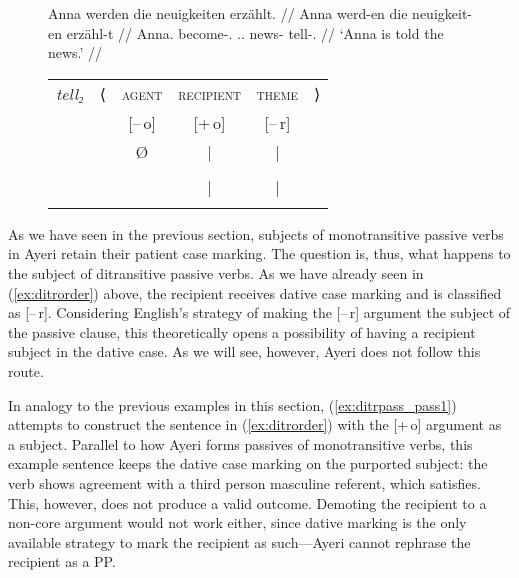 \begin{figure}
\a\label{ex:gerditrpass_pass2}%
\begingl
	\gla Anna werden die neuigkeiten erzählt. //
	\glb Anna werd-en die neuigkeit-en erzähl-t //
	\glc Anna.\Dat{} become-\Tpl{}.\Prs{} \Def{}.\Nom{}.\Pl{} news-\Pl{}
		tell-\Pst{}.\Ptcp{} //
	\glft `Anna is told the news.' //
\endgl
\medskip\\
\begin{tabular}[t]{@{} >{\itshape}l l c c c r}
tell₂
	& ⟨
	& \textsc{agent}
	& \textsc{recipient}
	& \textsc{theme}
	& ⟩
	\\
%
	& %
	& [–\,o]
	& [+\,o]
	& [–\,r]
	& %
	\\

%
	& %
	& Ø
	& |
	& |
	& %
	\\

%
	& %
	& %
	& \SObj*
	& \Subj
	& %
	\\

%
	& %
	& %
	& |
	& |
	& %
	\\

%
	& %
	& %
	& \fw{Anna}
	& \fw{news}
	& %
	\\
\end{tabular}

\xe
\end{figure}

As we have seen in the previous section, subjects of monotransitive passive
verbs in Ayeri retain their patient case marking. The question is, thus, what
happens to the subject of ditransitive passive verbs. As we have already seen
in (\ref{ex:ditrorder}) above, the recipient receives dative case marking and
is classified as [–\,r]. Considering English's strategy of making the [–\,r]
argument the subject of the passive clause, this theoretically opens a
possibility of having a recipient subject in the dative case. As we will see,
however, Ayeri does not follow this route.

In analogy to the previous examples in this section, (\ref{ex:ditrpass_pass1})
attempts to construct the sentence in (\ref{ex:ditrorder}) with the [+\,o]
argument as a subject. Parallel to how Ayeri forms passives of monotransitive
verbs, this example sentence keeps the dative case marking on the purported
subject: the verb shows agreement with a third person masculine referent, which
 satisfies. This, however, does not produce a valid
outcome. Demoting the recipient to a non-core argument would not work either,
since dative marking is the only available strategy to mark the recipient as
such---Ayeri cannot rephrase the recipient as a PP.

